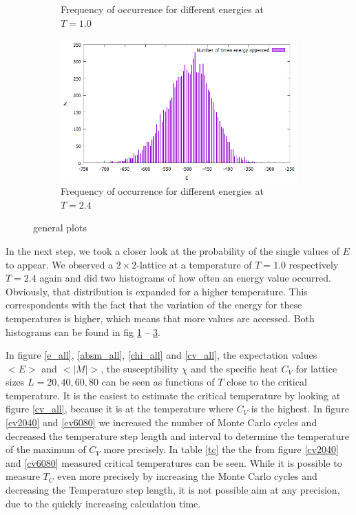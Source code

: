 \documentclass[10pt,a4paper]{article}
\begin{document}
\begin{figure}[h]
\begin{subfigure}{0.45\textwidth}
	\caption{Frequency of occurrence for different energies at $T=1.0$\label{d1}}
\end{subfigure}
\begin{subfigure}{0.45\textwidth}
	\includegraphics[width=\textwidth]{d24.png}
	\caption{Frequency of occurrence for different energies at $T=2.4$\label{d2}}
\end{subfigure}
\caption{general plots}
\end{figure}

In the next step, we took a closer look at the probability of the single values of $E$ to appear. We observed a $2\times2$-lattice at a temperature of $T=1.0$ respectively $T=2.4$ again and did two histograms of how often an energy value occurred. Obviously, that distribution is expanded for a higher temperature. This correspondents with the fact that the variation of the energy for these temperatures is higher, which means that more values are accessed. Both histograms can be found in fig \ref{d1} -- \ref{d2}.


\clearpage


In figure \ref{e_all}, \ref{absm_all}, \ref{chi_all} and \ref{cv_all}, the expectation values $<E>$ and $<|M|>$, the susceptibility $\chi$ and the specific heat $C_V$ for lattice sizes $L = 20, 40, 60, 80$ can be seen as functions of $T$ close to the critical temperature. It is the easiest to estimate the critical temperature by looking at figure \ref{cv_all}, because it is at the temperature where $C_V$ is the highest. In figure \ref{cv2040} and \ref{cv6080} we increased the number of Monte Carlo cycles and decreased the temperature step length and interval to determine the temperature of the maximum of $C_V$ more precisely. In table \ref{tc} the the from figure \ref{cv2040} and \ref{cv6080} measured critical temperatures can be seen. While it is possible to measure $T_C$ even more precisely by increasing the Monte Carlo cycles and decreasing the Temperature step length, it is not possible aim at any precision, due to the quickly increasing calculation time. 
\end{document}
